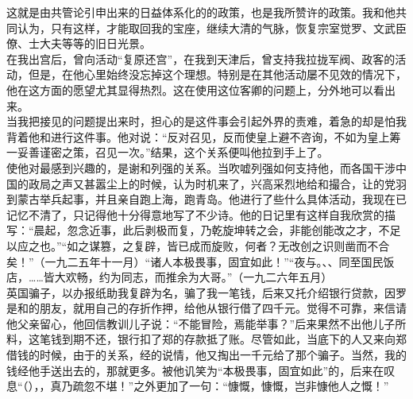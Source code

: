 这就是由共管论引申出来的日益体系化的的政策，也是我所赞许的政策。我和他共同认为，只有这样，才能取回我的宝座，继续大清的气脉，恢复宗室觉罗、文武臣僚、士大夫等等的旧日光景。\\

在我出宫后，曾向活动“复原还宫”，在我到天津后，曾支持我拉拢军阀、政客的活动，但是，在他心里始终没忘掉这个理想。特别是在其他活动屡不见效的情况下，他在这方面的愿望尤其显得热烈。这在使用这位客卿的问题上，分外地可以看出来。\\

当我把接见的问题提出来时，担心的是这件事会引起外界的责难，着急的却是怕我背着他和进行这件事。他对说：“反对召见，反而使皇上避不咨询，不如为皇上筹一妥善谨密之策，召见一次。”结果，这个关系便叫他拉到手上了。\\

使他对最感到兴趣的，是谢和列强的关系。当吹嘘列强如何支持他，而各国干涉中国的政局之声又甚嚣尘上的时候，认为时机来了，兴高采烈地给和撮合，让的党羽到蒙古举兵起事，并且亲自跑上海，跑青岛。他进行了些什么具体活动，我现在已记忆不清了，只记得他十分得意地写了不少诗。他的日记里有这样自我欣赏的描写：“晨起，忽念近事，此后剥极而复，乃乾旋坤转之会，非能创能改之才，不足以应之也。”“如之谋篡，之复辟，皆已成而旋败，何者？无改创之识则凿而不合矣！”（一九二五年十一月）“诸人本极畏事，固宜如此！”“夜与。、、同至国民饭店，……皆大欢畅，约为同志，而推余为大哥。”（一九二六年五月）\\

英国骗子，以办报纸助我复辟为名，骗了我一笔钱，后来又托介绍银行贷款，因罗是和的朋友，就用自己的存折作押，给他从银行借了四千元。觉得不可靠，来信请他父亲留心，他回信教训儿子说：“不能冒险，焉能举事？”后来果然不出他儿子所料，这笔钱到期不还，银行扣了郑的存款抵了账。尽管如此，当底下的人又来向郑借钱的时候，由于的关系，经的说情，他又掏出一千元给了那个骗子。当然，我的钱经他手送出去的，那就更多。被他讥笑为“本极畏事，固宜如此”的，后来在叹息“（），，真乃疏忽不堪！”之外更加了一句：“慷慨，慷慨，岂非慷他人之慨！”\\


